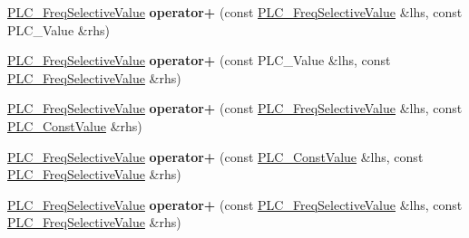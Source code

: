 \begin{DoxyCompactItemize}
\item 
\hypertarget{classns3_1_1PLC__FreqSelectiveValue_af2725f6e24032e2afe17930d39f6457d}{\hyperlink{classns3_1_1PLC__FreqSelectiveValue}{\-P\-L\-C\-\_\-\-Freq\-Selective\-Value} {\bfseries operator+} (const \hyperlink{classns3_1_1PLC__FreqSelectiveValue}{\-P\-L\-C\-\_\-\-Freq\-Selective\-Value} \&lhs, const \-P\-L\-C\-\_\-\-Value \&rhs)}\label{classns3_1_1PLC__FreqSelectiveValue_af2725f6e24032e2afe17930d39f6457d}

\item 
\hypertarget{classns3_1_1PLC__FreqSelectiveValue_a230380c1d0fc4df0b8f578e0538affa6}{\hyperlink{classns3_1_1PLC__FreqSelectiveValue}{\-P\-L\-C\-\_\-\-Freq\-Selective\-Value} {\bfseries operator+} (const \-P\-L\-C\-\_\-\-Value \&lhs, const \hyperlink{classns3_1_1PLC__FreqSelectiveValue}{\-P\-L\-C\-\_\-\-Freq\-Selective\-Value} \&rhs)}\label{classns3_1_1PLC__FreqSelectiveValue_a230380c1d0fc4df0b8f578e0538affa6}

\item 
\hypertarget{classns3_1_1PLC__FreqSelectiveValue_aba011f784f7339f6e32f603f19258edf}{\hyperlink{classns3_1_1PLC__FreqSelectiveValue}{\-P\-L\-C\-\_\-\-Freq\-Selective\-Value} {\bfseries operator+} (const \hyperlink{classns3_1_1PLC__FreqSelectiveValue}{\-P\-L\-C\-\_\-\-Freq\-Selective\-Value} \&lhs, const \hyperlink{classns3_1_1PLC__ConstValue}{\-P\-L\-C\-\_\-\-Const\-Value} \&rhs)}\label{classns3_1_1PLC__FreqSelectiveValue_aba011f784f7339f6e32f603f19258edf}

\item 
\hypertarget{classns3_1_1PLC__FreqSelectiveValue_aca7f5f740941099c021d41f7141a6484}{\hyperlink{classns3_1_1PLC__FreqSelectiveValue}{\-P\-L\-C\-\_\-\-Freq\-Selective\-Value} {\bfseries operator+} (const \hyperlink{classns3_1_1PLC__ConstValue}{\-P\-L\-C\-\_\-\-Const\-Value} \&lhs, const \hyperlink{classns3_1_1PLC__FreqSelectiveValue}{\-P\-L\-C\-\_\-\-Freq\-Selective\-Value} \&rhs)}\label{classns3_1_1PLC__FreqSelectiveValue_aca7f5f740941099c021d41f7141a6484}

\item 
\hypertarget{classns3_1_1PLC__FreqSelectiveValue_a4267d658fc4b0452fd5d79d0b5317259}{\hyperlink{classns3_1_1PLC__FreqSelectiveValue}{\-P\-L\-C\-\_\-\-Freq\-Selective\-Value} {\bfseries operator+} (const \hyperlink{classns3_1_1PLC__FreqSelectiveValue}{\-P\-L\-C\-\_\-\-Freq\-Selective\-Value} \&lhs, const \hyperlink{classns3_1_1PLC__FreqSelectiveValue}{\-P\-L\-C\-\_\-\-Freq\-Selective\-Value} \&rhs)}\label{classns3_1_1PLC__FreqSelectiveValue_a4267d658fc4b0452fd5d79d0b5317259}


\end{DoxyCompactItemize}
